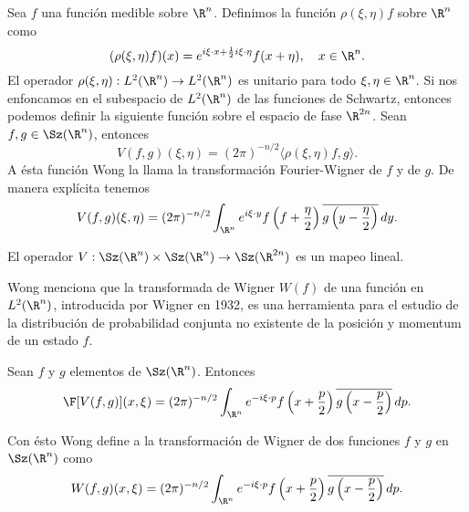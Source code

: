   Sea $f$ una función medible sobre $\R^{n}$. Definimos la
  función $\rho(\xi,\eta)f$ sobre $\R^{n}$ como
  \begin{equation}
    (\rho(\xi,\eta)f)(x)
    = e^{i\xi \cdot x + \frac{1}{2} i \xi \cdot \eta}
    f(x+\eta),
    \quad x \in \R^{n}.
  \end{equation}
  El operador $\rho(\xi,\eta) : L^2(\R^{n}) \to L^2(\R^{n})$
  es unitario para todo $\xi, \eta \in \R^{n}$. Si nos
  enfoncamos en el subespacio de $L^2(\R^{n})$ de las
  funciones de Schwartz, entonces podemos definir la
  siguiente función sobre el espacio de fase $\R^{2n}$. Sean
  $f,g \in \Sz(\R^{n})$, entonces
  \begin{equation}
    V(f,g)(\xi,\eta)
    = (2\pi)^{-n / 2} \langle \rho(\xi,\eta)f, g \rangle.
  \end{equation}
  A ésta función Wong la llama la transformación
  Fourier-Wigner de $f$ y de $g$. De manera explícita
  tenemos 
  \begin{equation}
    V(f,g)(\xi,\eta)
    = (2\pi)^{-n / 2} \int_{\R^{n}} e^{i \xi \cdot y}
    f\left( f + \frac{\eta}{2} \right) \overline{g\left( y -
    \frac{\eta}{2}\right) } \, dy.
  \end{equation}

  El operador $V : \Sz(\R^{n}) \times \Sz(\R^{n}) \to
  \Sz(\R^{2n})$ es un mapeo lineal.

  Wong menciona que la transformada de Wigner $W(f)$ de una
  función en $L^2(\R^{n})$, introducida por Wigner en 1932,
  es una herramienta para el estudio de la distribución de
  probabilidad conjunta no existente de la posición y
  momentum de un estado $f$.

  \begin{theorem}
    Sean $f$ y $g$ elementos de $\Sz(\R^{n})$. Entonces
    \begin{equation}
      \F[V(f,g)](x,\xi)
      = (2\pi)^{-n / 2} \int_{\R^{n}} e^{-i \xi \cdot p
      } f\left( x + \frac{p}{2} \right)
      \overline{g\left( x - \frac{p}{2} \right)} \, dp.
    \end{equation}
  \end{theorem}

  Con ésto Wong define a la transformación de Wigner de dos
  funciones $f$ y $g$ en $\Sz(\R^{n})$ como
  \begin{equation}
    W(f,g)(x,\xi)
    = (2\pi)^{-n / 2} \int_{\R^{n}} e^{-i\xi \cdot p}
    f\left( x + \frac{p}{2} \right) \overline{g\left( x -
    \frac{p}{2} \right) } \, dp.
  \end{equation}

